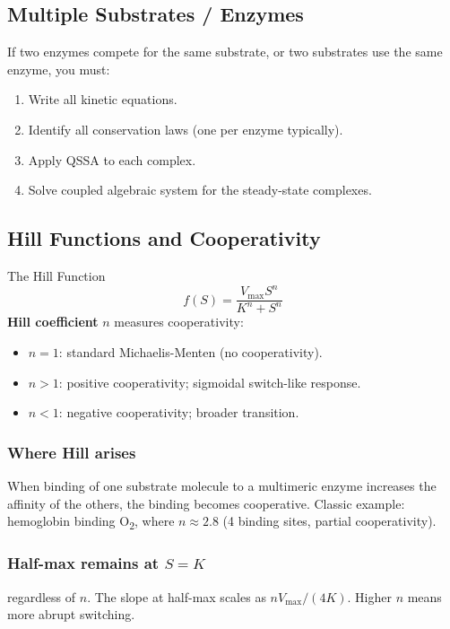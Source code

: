 \documentclass[11pt]{article}
\begin{document}
\subsection{Multiple Substrates / Enzymes}

If two enzymes compete for the same substrate, or two substrates use the same enzyme, you must:
\begin{enumerate}
\item Write all kinetic equations.
\item Identify all conservation laws (one per enzyme typically).
\item Apply QSSA to each complex.
\item Solve coupled algebraic system for the steady-state complexes.
\end{enumerate}

\subsection{Hill Functions and Cooperativity}

\begin{conceptbox}{The Hill Function}
\[
f(S) = \frac{V_{\max} S^n}{K^n + S^n}
\]
\textbf{Hill coefficient} $n$ measures cooperativity:
\begin{itemize}
\item $n=1$: standard Michaelis-Menten (no cooperativity).
\item $n>1$: positive cooperativity; sigmoidal switch-like response.
\item $n<1$: negative cooperativity; broader transition.
\end{itemize}
\end{conceptbox}

\subsubsection{Where Hill arises} When binding of one substrate molecule to a multimeric enzyme increases the affinity of the others, the binding becomes cooperative. Classic example: hemoglobin binding O\textsubscript{2}, where $n \approx 2.8$ (4 binding sites, partial cooperativity).

\subsubsection{Half-max remains at $S = K$} regardless of $n$. The slope at half-max scales as $n V_{\max}/(4K)$. Higher $n$ means more abrupt switching.
\end{document}
